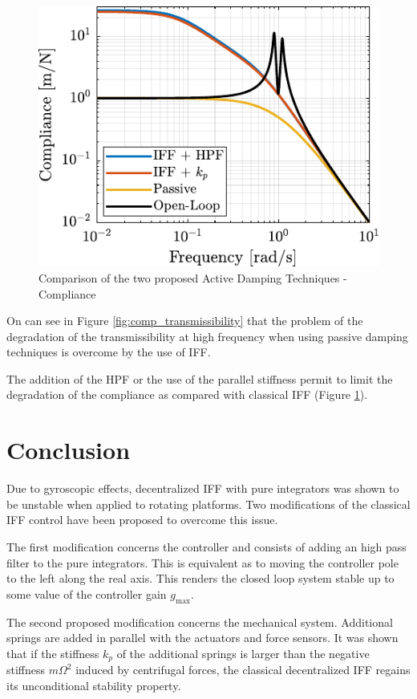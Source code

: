\documentclass[Afour,sagev,times]{sagej}
\begin{document}
\begin{figure}[htbp]
\centering
\includegraphics[scale=1]{figs/comp_compliance.pdf}
\caption{\label{fig:comp_compliance}Comparison of the two proposed Active Damping Techniques - Compliance}
\end{figure}

On can see in Figure \ref{fig:comp_transmissibility} that the problem of the degradation of the transmissibility at high frequency when using passive damping techniques is overcome by the use of IFF.

The addition of the HPF or the use of the parallel stiffness permit to limit the degradation of the compliance as compared with classical IFF (Figure \ref{fig:comp_compliance}).

\section{Conclusion}
\label{sec:org6cd163b}
\label{sec:conclusion}

Due to gyroscopic effects, decentralized IFF with pure integrators was shown to be unstable when applied to rotating platforms.
Two modifications of the classical IFF control have been proposed to overcome this issue.

The first modification concerns the controller and consists of adding an high pass filter to the pure integrators.
This is equivalent as to moving the controller pole to the left along the real axis.
This renders the closed loop system stable up to some value of the controller gain \(g_\text{max}\).

The second proposed modification concerns the mechanical system.
Additional springs are added in parallel with the actuators and force sensors.
It was shown that if the stiffness \(k_p\) of the additional springs is larger than the negative stiffness \(m \Omega^2\) induced by centrifugal forces, the classical decentralized IFF regains its unconditional stability property.
\end{document}
